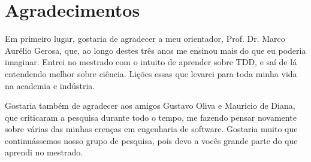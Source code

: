 \documentclass[11pt,openany,twoside,a4paper]{book}
\begin{document}




    
      


\chapter*{Agradecimentos}

Em primeiro lugar, gostaria de agradecer a meu orientador, Prof. Dr. Marco Aurélio
Gerosa, que, ao longo destes três anos me ensinou mais do que eu poderia imaginar.
Entrei no mestrado com o intuito de aprender sobre TDD, e saí de lá entendendo
melhor sobre ciência. 
Lições essas que levarei para toda minha vida na academia e indústria.

Gostaria também de agradecer aos amigos Gustavo Oliva e Mauricio de Diana, que
criticaram a pesquisa durante todo o tempo, me fazendo pensar novamente sobre
várias das minhas crenças em engenharia de software. Gostaria muito que continuássemos
nosso grupo de pesquisa, pois devo a vocês grande parte do que aprendi no mestrado.
\end{document}
